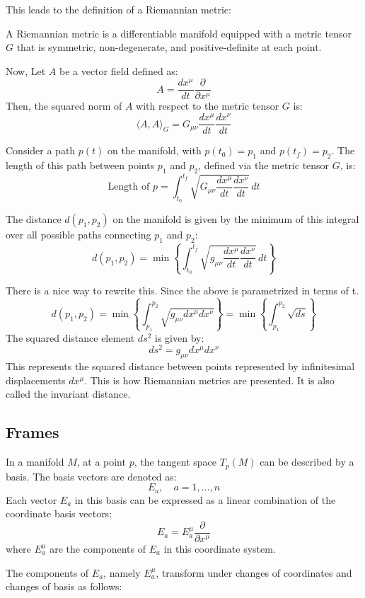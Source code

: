 \documentclass{article}
\begin{document}
This leads to the definition of a Riemannian metric:
\begin{theorem}
    A Riemannian metric is a differentiable manifold equipped with a metric tensor \( G \) that is symmetric, non-degenerate, and positive-definite at each point.
\end{theorem}

Now, Let \( A \) be a vector field defined as:
\[
A = \frac{dx^\mu}{dt} \frac{\partial}{\partial x^\mu}
\]
Then, the squared norm of \( A \) with respect to the metric tensor \( G \) is:
\[
\langle A, A \rangle_G = G_{\mu \nu} \frac{dx^\mu}{dt} \frac{dx^\nu}{dt}
\]

Consider a path \( p(t) \) on the manifold, with \( p(t_0) = p_1 \) and \( p(t_f) = p_2 \). The length of this path between points \( p_1 \) and \( p_2 \), defined via the metric tensor \( G \), is:
\[
\text{Length of } p = \int_{t_0}^{t_f} \sqrt{G_{\mu \nu} \frac{dx^\mu}{dt} \frac{dx^\nu}{dt}} \, dt
\]

The distance \( d(p_1, p_2) \) on the manifold is given by the minimum of this integral over all possible paths connecting \( p_1 \) and \( p_2 \):
\[
d(p_1, p_2) = \min \left\{ \int_{t_0}^{t_f} \sqrt{g_{\mu \nu} \frac{dx^\mu}{dt} \frac{dx^\nu}{dt}} \, dt \right\}
\]

There is a nice way to rewrite this. Since the above is parametrized in terms of t. 
\[
d(p_1, p_2) = \min \left\{ \int_{p_1}^{p_2} \sqrt{g_{\mu \nu} dx^\mu dx^\nu } \right\}
 = \min \left\{ \int_{p_1}^{p_2} \sqrt{ds} 
    \right\}
\]
The squared distance element \( ds^2 \) is given by:
\[
ds^2 = g_{\mu \nu} dx^\mu dx^\nu
\]
This represents the squared distance between points represented by infinitesimal displacements \( dx^\mu \). This is how Riemannian metrics are presented. It is also called the invariant distance. 

\subsection{Frames}

In a manifold $M$, at a point $p$, the tangent space $T_p(M)$ can be described by a basis. The basis vectors are denoted as:
\[
E_a, \quad a = 1, \ldots, n
\]
Each vector $E_a$ in this basis can be expressed as a linear combination of the coordinate basis vectors:
\[
E_a = E_a^\mu \frac{\partial}{\partial x^\mu}
\]
where $E_a^\mu$ are the components of $E_a$ in this coordinate system.

The components of $E_a$, namely $E_a^\mu$, transform under changes of coordinates and changes of basis as follows:
\end{document}
